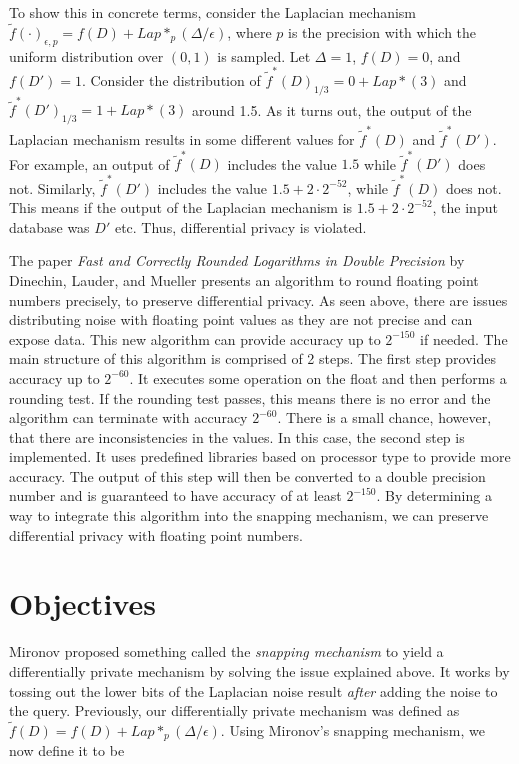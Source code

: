 \documentclass[11pt]{exam}
\begin{document}
To show this in concrete terms, consider the Laplacian mechanism $\tilde{f}(\cdot)_{\epsilon,p} = f(D) + Lap*_p (\Delta/\epsilon)$, where $p$ is the precision with which the uniform distribution over $(0,1)$ is sampled.  Let $\Delta = 1$, $f(D) = 0$, and $f(D') = 1$.  Consider the distribution of $\tilde{f}^*(D)_{1/3} = 0 + Lap*(3)$ and $\tilde{f}^*(D')_{1/3} = 1 + Lap*(3)$ around 1.5.  As it turns out, the output of the Laplacian mechanism results in some different values for $\tilde{f}^*(D)$ and $\tilde{f}^*(D')$.  For example, an output of $\tilde{f}^*(D)$ includes the value $1.5$ while $\tilde{f}^*(D')$ does not.  Similarly, $\tilde{f}^*(D')$ includes the value $1.5 + 2 \cdot 2^{-52}$, while $\tilde{f}^*(D)$ does not.  This means if the output of the Laplacian mechanism is $1.5 + 2 \cdot 2^{-52}$, the input database was $D'$ etc.  Thus, differential privacy is violated.

The paper \textit{Fast and Correctly Rounded Logarithms in Double Precision} by Dinechin, Lauder, and Mueller presents an algorithm to round floating point numbers precisely, to preserve differential privacy. As seen above, there are issues distributing noise with floating point values as they are not precise and can expose data. This new algorithm can provide accuracy up to $2^{-150}$ if needed. The main structure of this algorithm is comprised of 2 steps. The first step provides accuracy up to $2^{-60}$. It executes some operation on the float and then performs a rounding test. If the rounding test passes, this means there is no error and the algorithm can terminate with accuracy $2^{-60}$. There is a small chance, however, that there are inconsistencies in the values. In this case, the second step is implemented. It uses predefined libraries based on processor type to provide more accuracy. The output of this step will then be converted to a double precision number and is guaranteed to have accuracy of at least $2^{-150}$. By determining a way to integrate this algorithm into the snapping mechanism, we can preserve differential privacy with floating point numbers.  

\section{Objectives} 

Mironov proposed something called the \textit{snapping mechanism} to yield a differentially private mechanism by solving the issue explained above.  It works by tossing out the lower bits of the Laplacian noise result \textit{after} adding the noise to the query.  Previously, our differentially private mechanism was defined as $\tilde{f}(D) = f(D) + Lap*_p (\Delta/\epsilon)$.  Using Mironov's snapping mechanism, we now define it to be
\end{document}
